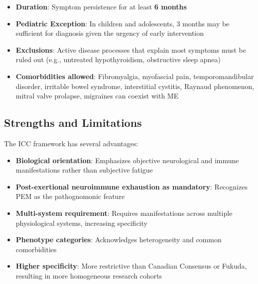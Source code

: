 \begin{itemize}
    \item \textbf{Duration}: Symptom persistence for at least \textbf{6 months}
    \item \textbf{Pediatric Exception}: In children and adolescents, 3 months may be sufficient for diagnosis given the urgency of early intervention
    \item \textbf{Exclusions}: Active disease processes that explain most symptoms must be ruled out (e.g., untreated hypothyroidism, obstructive sleep apnea)
    \item \textbf{Comorbidities allowed}: Fibromyalgia, myofascial pain, temporomandibular disorder, irritable bowel syndrome, interstitial cystitis, Raynaud phenomenon, mitral valve prolapse, migraines can coexist with ME
\end{itemize}

\subsection{Strengths and Limitations}

\begin{observation}
\label{obs:icc-strengths}
The ICC framework has several advantages:
\begin{itemize}
    \item \textbf{Biological orientation}: Emphasizes objective neurological and immune manifestations rather than subjective fatigue
    \item \textbf{Post-exertional neuroimmune exhaustion as mandatory}: Recognizes PEM as the pathognomonic feature
    \item \textbf{Multi-system requirement}: Requires manifestations across multiple physiological systems, increasing specificity
    \item \textbf{Phenotype categories}: Acknowledges heterogeneity and common comorbidities
    \item \textbf{Higher specificity}: More restrictive than Canadian Consensus or Fukuda, resulting in more homogeneous research cohorts
\end{itemize}
\end{observation}

